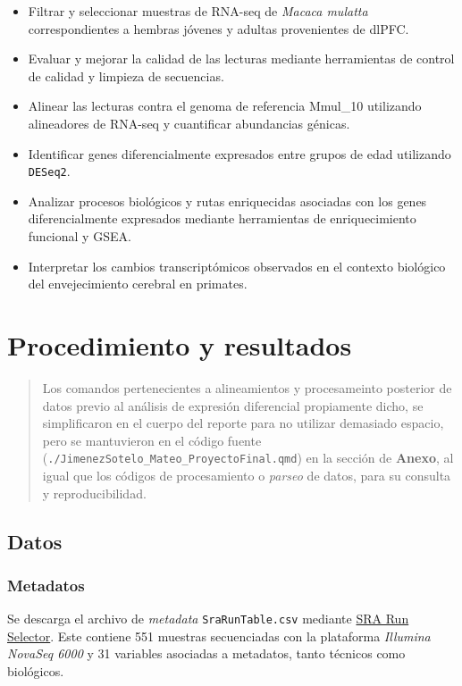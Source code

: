 \documentclass[
  12pt,
  letterpaper,
  DIV=11,
  numbers=noendperiod]{scrartcl}
\begin{document}
\begin{itemize}
\item
  Filtrar y seleccionar muestras de RNA-seq de \emph{Macaca mulatta}
  correspondientes a hembras jóvenes y adultas provenientes de dlPFC.
\item
  Evaluar y mejorar la calidad de las lecturas mediante herramientas de
  control de calidad y limpieza de secuencias.
\item
  Alinear las lecturas contra el genoma de referencia Mmul\_10
  utilizando alineadores de RNA-seq y cuantificar abundancias génicas.
\item
  Identificar genes diferencialmente expresados entre grupos de edad
  utilizando \texttt{DESeq2}.
\item
  Analizar procesos biológicos y rutas enriquecidas asociadas con los
  genes diferencialmente expresados mediante herramientas de
  enriquecimiento funcional y GSEA.
\item
  Interpretar los cambios transcriptómicos observados en el contexto
  biológico del envejecimiento cerebral en primates.
\end{itemize}

\section{Procedimiento y resultados}\label{procedimiento-y-resultados}

\begin{quote}
Los comandos pertenecientes a alineamientos y procesameinto posterior de
datos previo al análisis de expresión diferencial propiamente dicho, se
simplificaron en el cuerpo del reporte para no utilizar demasiado
espacio, pero se mantuvieron en el código fuente
(\texttt{./JimenezSotelo\_Mateo\_ProyectoFinal.qmd}) en la sección de
\textbf{Anexo}, al igual que los códigos de procesamiento o
\emph{parseo} de datos, para su consulta y reproducibilidad.
\end{quote}

\subsection{Datos}\label{datos}

\subsubsection{Metadatos}\label{metadatos}

Se descarga el archivo de \emph{metadata} \texttt{SraRunTable.csv}
mediante
\href{https://www.ncbi.nlm.nih.gov/Traces/study/?acc=PRJNA743289&o=acc_s\%3Aa}{SRA
Run Selector}. Este contiene 551 muestras secuenciadas con la plataforma
\emph{Illumina NovaSeq 6000} y 31 variables asociadas a metadatos, tanto
técnicos como biológicos.
\end{document}
